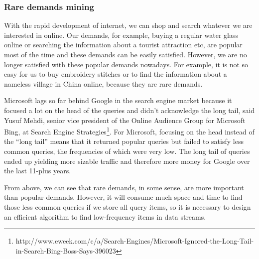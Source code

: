\documentclass[conference]{IEEEtran}
\begin{document}
\subsubsection{Rare demands mining}
With the rapid development of internet, we can shop and search whatever we are interested in online. Our demands, for example, buying a regular water glass online or searching the information about a tourist attraction etc, are popular most of the time and these demands can be easily satisfied. However, we are no longer satisfied with these popular demands nowadays. For example, it is not so easy for us to buy embroidery stitches or to find the information about a nameless village in China online, because they are rare demands.\par
Microsoft lags so far behind Google in the search engine market because it focused a lot on the head of the queries and didn't acknowledge the long tail, said Yusuf Mehdi, senior vice president of the Online Audience Group for Microsoft Bing, at Search Engine Strategies\footnote{http://www.eweek.com/c/a/Search-Engines/Microsoft-Ignored-the-Long-Tail-in-Search-Bing-Boss-Says-396023}. For Microsoft, focusing on the head instead of the ``long tail'' means that it returned popular queries but failed to satisfy less common queries, the frequencies of which were very low. The long tail of queries ended up yielding more sizable traffic and therefore more money for Google over the last 11-plus years.\par 
From above, we can see that rare demands, in some sense, are more important than popular demands. However, it will consume much space and time to find those less common queries if we store all query items, so it is necessary to design an efficient algorithm to find low-frequency items in data streams.
\end{document}
